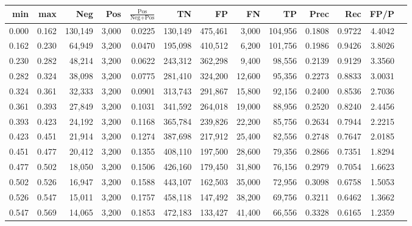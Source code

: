 \begin{tabular}{rrrrrrrrrrrrr}
\toprule
  min &   max &     Neg &   Pos & $\frac{\text{Pos}}{\text{Neg}+\text{Pos}}$ &      TN &      FP &      FN &      TP &   Prec &    Rec &   FP/P \\
\midrule
0.000 & 0.162 & 130,149 & 3,000 &                                     0.0225 & 130,149 & 475,461 &   3,000 & 104,956 & 0.1808 & 0.9722 & 4.4042 \\
0.162 & 0.230 &  64,949 & 3,200 &                                     0.0470 & 195,098 & 410,512 &   6,200 & 101,756 & 0.1986 & 0.9426 & 3.8026 \\
0.230 & 0.282 &  48,214 & 3,200 &                                     0.0622 & 243,312 & 362,298 &   9,400 &  98,556 & 0.2139 & 0.9129 & 3.3560 \\
0.282 & 0.324 &  38,098 & 3,200 &                                     0.0775 & 281,410 & 324,200 &  12,600 &  95,356 & 0.2273 & 0.8833 & 3.0031 \\
0.324 & 0.361 &  32,333 & 3,200 &                                     0.0901 & 313,743 & 291,867 &  15,800 &  92,156 & 0.2400 & 0.8536 & 2.7036 \\
0.361 & 0.393 &  27,849 & 3,200 &                                     0.1031 & 341,592 & 264,018 &  19,000 &  88,956 & 0.2520 & 0.8240 & 2.4456 \\
0.393 & 0.423 &  24,192 & 3,200 &                                     0.1168 & 365,784 & 239,826 &  22,200 &  85,756 & 0.2634 & 0.7944 & 2.2215 \\
0.423 & 0.451 &  21,914 & 3,200 &                                     0.1274 & 387,698 & 217,912 &  25,400 &  82,556 & 0.2748 & 0.7647 & 2.0185 \\
0.451 & 0.477 &  20,412 & 3,200 &                                     0.1355 & 408,110 & 197,500 &  28,600 &  79,356 & 0.2866 & 0.7351 & 1.8294 \\
0.477 & 0.502 &  18,050 & 3,200 &                                     0.1506 & 426,160 & 179,450 &  31,800 &  76,156 & 0.2979 & 0.7054 & 1.6623 \\
0.502 & 0.526 &  16,947 & 3,200 &                                     0.1588 & 443,107 & 162,503 &  35,000 &  72,956 & 0.3098 & 0.6758 & 1.5053 \\
0.526 & 0.547 &  15,011 & 3,200 &                                     0.1757 & 458,118 & 147,492 &  38,200 &  69,756 & 0.3211 & 0.6462 & 1.3662 \\
0.547 & 0.569 &  14,065 & 3,200 &                                     0.1853 & 472,183 & 133,427 &  41,400 &  66,556 & 0.3328 & 0.6165 & 1.2359 \\

\end{tabular}
